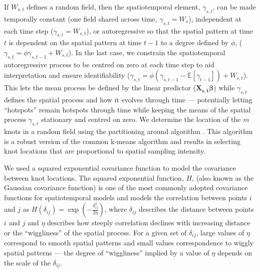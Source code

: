 \documentclass[12pt,english]{article}
\begin{document}
\begin{spacing}{1.25}
If $W_{s,t}$ defines a random field, then the spatiotemporal element,
$\gamma_{s,t}$, can be made temporally constant (one field shared across time,
$\gamma_{s,t} = W_{s}$), independent at each time step ($\gamma_{s,t} =
W_{s,t}$), or autoregressive so that the spatial pattern at time $t$ is
dependent on the spatial pattern at time $t-1$ to a degree defined by $\phi$,
($\gamma_{s,t} = \phi \gamma_{s,t-1} + W_{s,t}$).
In the last case,
we constrain the spatiotemporal autoregressive process to be centred on zero at
each time step to aid interpretation and ensure identifiability ($\gamma_{s,t}
= \phi (\gamma_{s,t-1} - \mathbb{E}[\gamma_{t-1}]) + W_{s,t}$). This lets the
mean process be defined by the linear predictor ($\bm{X_{s,t}}\bm{\beta}$)
while $\gamma_{s,t}$ defines the spatial process and how it evolves through
time --- potentially letting ``hotspots'' remain hotspots through time while
keeping the means of the spatial process $\gamma_{s,t}$ stationary and centred
on zero. We determine the location of the $m$ knots in a random field
using the partitioning around
algorithm \citep[the \texttt{pam} function in the R package
\textbf{cluster};][]{reynolds2006}. This algorithm is a robust version of the
common k-means algorithm and results in selecting knot locations that are
proportional to spatial sampling intensity.

We used a squared exponential covariance function to model the covariance
between knot locations. The squared exponential function, $H$,
(also known as the Gaussian covariance function)
is one of the most commonly adopted covariance
functions for spatiotemporal models
and models the correlation between
points $i$ and $j$ as $H(\delta_{ij}) = \exp \left(-\frac{\delta_{ij}^2}{2 \eta} \right)$,
where $\delta_{ij}$ describes the distance between points $i$ and $j$
and $\eta$ describes how steeply correlation declines with increasing distance
or the ``wiggliness'' of the spatial process.
For a given set of $\delta_{ij}$, large values of $\eta$ correspond
to smooth spatial patterns and small values correspondence to wiggly spatial patterns ---
the degree of ``wiggliness'' implied by a value of $\eta$ depends on the scale of the
$\delta_{ij}$.


\end{spacing}
\end{document}
